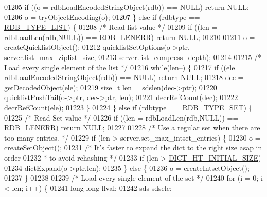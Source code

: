 \begin{DoxyCode}
{{{{{{{{{{{{{{{{{{{{{{{01205         \textcolor{keywordflow}{if} ((o = rdbLoadEncodedStringObject(rdb)) == NULL) \textcolor{keywordflow}{return} NULL;
01206         o = tryObjectEncoding(o);
01207     \} \textcolor{keywordflow}{else} \textcolor{keywordflow}{if} (rdbtype == \hyperlink{rdb_8h_aaa1836beb7e9668740980b593fb09978}{RDB\_TYPE\_LIST}) \{
01208         \textcolor{comment}{/* Read list value */}
01209         \textcolor{keywordflow}{if} ((len = rdbLoadLen(rdb,NULL)) == \hyperlink{rdb_8h_aa66b6ad7261656029e6a67cf78432b2d}{RDB\_LENERR}) \textcolor{keywordflow}{return} NULL;
01210 
01211         o = createQuicklistObject();
01212         quicklistSetOptions(o->ptr, server.list\_max\_ziplist\_size,
01213                             server.list\_compress\_depth);
01214 
01215         \textcolor{comment}{/* Load every single element of the list */}
01216         \textcolor{keywordflow}{while}(len--) \{
01217             \textcolor{keywordflow}{if} ((ele = rdbLoadEncodedStringObject(rdb)) == NULL) \textcolor{keywordflow}{return} NULL;
01218             dec = getDecodedObject(ele);
01219             size\_t len = sdslen(dec->ptr);
01220             quicklistPushTail(o->ptr, dec->ptr, len);
01221             decrRefCount(dec);
01222             decrRefCount(ele);
01223         \}
01224     \} \textcolor{keywordflow}{else} \textcolor{keywordflow}{if} (rdbtype == \hyperlink{rdb_8h_a164174151582b9f8ce35cda22215abf5}{RDB\_TYPE\_SET}) \{
01225         \textcolor{comment}{/* Read Set value */}
01226         \textcolor{keywordflow}{if} ((len = rdbLoadLen(rdb,NULL)) == \hyperlink{rdb_8h_aa66b6ad7261656029e6a67cf78432b2d}{RDB\_LENERR}) \textcolor{keywordflow}{return} NULL;
01227 
01228         \textcolor{comment}{/* Use a regular set when there are too many entries. */}
01229         \textcolor{keywordflow}{if} (len > server.set\_max\_intset\_entries) \{
01230             o = createSetObject();
01231             \textcolor{comment}{/* It's faster to expand the dict to the right size asap in order}
01232 \textcolor{comment}{             * to avoid rehashing */}
01233             \textcolor{keywordflow}{if} (len > \hyperlink{dict_8h_aff97c19d1616cf2c697573ee3f515692}{DICT\_HT\_INITIAL\_SIZE})
01234                 dictExpand(o->ptr,len);
01235         \} \textcolor{keywordflow}{else} \{
01236             o = createIntsetObject();
01237         \}
01238 
01239         \textcolor{comment}{/* Load every single element of the set */}
01240         \textcolor{keywordflow}{for} (i = 0; i < len; i++) \{
01241             \textcolor{keywordtype}{long} \textcolor{keywordtype}{long} llval;
01242             sds sdsele;
}}}}}}}}}}}}}}}}}}}}}}}
\end{DoxyCode}
